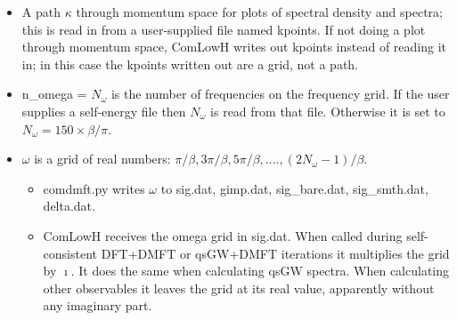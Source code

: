 \documentclass[aps,prb,singlecolumn,preprintnumbers,amsmath,amssymb]{revtex4}
\begin{document}
\begin{itemize}
\item A path $\kappa$ through momentum space for plots of spectral density and spectra; this is read in from a user-supplied file named kpoints.  If not doing a plot through momentum space, ComLowH writes out kpoints instead of reading it in; in this case the kpoints written out are a grid, not a path.
\item n\_omega = $N_\omega$ is the number of frequencies on the frequency grid.  If the user supplies a self-energy file then $N_\omega$ is read from that file.  Otherwise it is set to $N_\omega = 150 \times \beta / \pi$.
\item $\omega$ is a grid of real numbers: $\pi/\beta, 3\pi/\beta, 5\pi/\beta, .... , (2 N_\omega - 1)/\beta $.  
\begin{itemize}
\item comdmft.py writes $\omega$ to sig.dat, gimp.dat, sig\_bare.dat, sig\_smth.dat,  delta.dat. 
\item ComLowH receives the omega grid in sig.dat.  When called during self-consistent DFT+DMFT or qsGW+DMFT iterations it multiplies the grid by $\imath$.  It does the same when calculating qsGW spectra.  When calculating other observables it leaves the grid at its real value, apparently without any imaginary part.
\end{itemize}


\end{itemize}
\end{document}
